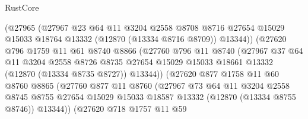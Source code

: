 \begin{lexlean}{RustCore}
\begin{coremodule}
                        (@27965
                          (@27967
                            @23
                            @64
                            @11
                            @3204
                            @2558
                            @8708
                            @8716
                            @27654
                            @15029
                            @15033
                            @18764
                            @13332
                            (@12870 (@13334 @8716 @8709))
                            @13344))
                        (@27620
                          @796
                          @1759
                          @11
                          @61
                          @8740
                          @8866
                          (@27760
                            @796
                            @11
                            @8740
                            (@27967
                              @37
                              @64
                              @11
                              @3204
                              @2558
                              @8726
                              @8735
                              @27654
                              @15029
                              @15033
                              @18661
                              @13332
                              (@12870 (@13334 @8735 @8727))
                              @13344))
                          (@27620
                            @877
                            @1758
                            @11
                            @60
                            @8760
                            @8865
                            (@27760
                              @877
                              @11
                              @8760
                              (@27967
                                @73
                                @64
                                @11
                                @3204
                                @2558
                                @8745
                                @8755
                                @27654
                                @15029
                                @15033
                                @18587
                                @13332
                                (@12870 (@13334 @8755 @8746))
                                @13344))
                            (@27620
                              @718
                              @1757
                              @11
                              @59

\end{coremodule}
\end{lexlean}
